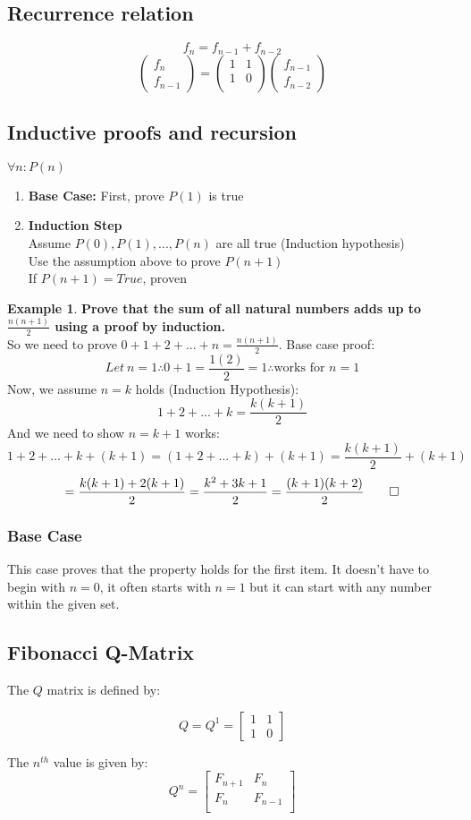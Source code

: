 \documentclass{article}
\theoremstyle{definition}
\newtheorem{ex}{Example}[section]
\begin{document}
  \subsection{Recurrence relation}
  \[f_n = f_{n-1} + f_{n-2}\]
  \[
    \begin{pmatrix}
      f_n \\
      f_{n-1}
    \end{pmatrix} = \begin{pmatrix}
    1 & 1 \\
    1 & 0 \\
    \end{pmatrix} \begin{pmatrix}
    f_{n-1} \\
    f_{n-2}
    \end{pmatrix}
  \]
  \subsection{Inductive proofs and recursion}
  $\forall n : P(n)$
  \begin{enumerate}
    \item \textbf{Base Case:} First, prove $P(1)$ is true
    \item \textbf{Induction Step} \\
      Assume $P(0), P(1), ..., P(n)$ are all true (Induction hypothesis)\\
      Use the assumption above to prove $P(n+1)$\\
      If $P(n+1) = True$, proven
  \end{enumerate}

  \begin{ex}
    \textbf{Prove that the sum of all natural numbers adds up to $\frac{n(n+1)}{2}$ using a proof by induction.}\\
    So we need to prove $0+1+2+...+n=\frac{n(n+1)}{2}$. Base case proof:
    \[Let\ n = 1 \therefore 0+1 = \frac{1(2)}{2} = 1 \therefore \text{works for }n=1\]
    Now, we assume $n=k$ holds (Induction Hypothesis):
    \[1+2+...+k=\frac{k(k+1)}{2}\]
    And we need to show $n=k+1$ works:
    \[1+2+...+k+(k+1) = (1+2+...+k)+(k+1) = \frac{k(k+1)}{2}+(k+1)\]
    \[=\frac{k(k+1) + 2(k+1)}{2} = \frac{k^2+3k+1}{2} = \frac{(k+1)(k+2)}{2} \qed\]
  \end{ex}

  \subsubsection{Base Case}
  This case proves that the property holds for the first item. It doesn't have to begin with $n=0$, it often starts with $n=1$ but it can start with any number within the given set.
  \subsection{Fibonacci Q-Matrix}
  The $Q$ matrix is defined by:
  
  \[Q = Q^1 = \begin{bmatrix}
    1 & 1 \\
    1 & 0
  \end{bmatrix}
  \]

The $n^{th}$ value is given by:\[
Q^n = \begin{bmatrix}
  F_{n+1} & F_n \\
  F_n & F_{n-1} \\
\end{bmatrix}
  \]
\end{document}

